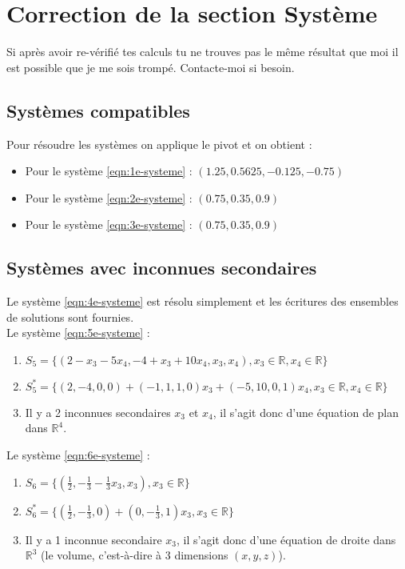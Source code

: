 \documentclass[a4paper]{article}\usepackage[]{graphicx}\usepackage[]{xcolor}
\newcommand{\R}{\mathbb{R}}
\begin{document}
\newpage

\section*{Correction de la section Système}
Si après avoir re-vérifié tes calculs tu ne trouves pas le même résultat que moi
il est possible que je me sois trompé. Contacte-moi si besoin.

\vspace{0,75cm}

\subsection*{Systèmes compatibles}

Pour résoudre les systèmes on applique le pivot et on obtient :
\begin{itemize}
    \item Pour le système \ref{eqn:1e-systeme} : $(1.25, 0.5625, -0.125, -0.75)$
    \item Pour le système \ref{eqn:2e-systeme} : $(0.75, 0.35, 0.9)$
    \item Pour le système \ref{eqn:3e-systeme} : $(0.75, 0.35, 0.9)$
\end{itemize}

\subsection*{Systèmes avec inconnues secondaires}
Le système \ref{eqn:4e-systeme} est résolu simplement et les écritures des 
ensembles de solutions sont fournies.\\

Le système \ref{eqn:5e-systeme} :
\begin{enumerate}
    \item $S_5 = \{(2 - x_3 - 5 x_4, -4 + x_3 + 10 x_4, x_3, x_4), x_3\in\R, x_4 \in \R \}$
    \item $S_5^* = \{(2, -4, 0, 0) + (-1, 1, 1, 0) x_3 + (-5, 10, 0, 1) x_4, x_3\in\R, x_4 \in \R \}$
    \item Il y a 2 inconnues secondaires $x_3$ et $x_4$, il s'agit donc d'une équation de plan dans $\R^4$.
\end{enumerate}

Le système \ref{eqn:6e-systeme} :
\begin{enumerate}
    \item $S_6 = \{(\frac{1}{2}, -\frac{1}{3} -\frac{1}{3} x_3, x_3), x_3\in\R\}$
    \item $S_6^* = \{(\frac{1}{2}, - \frac{1}{3}, 0) + (0, -\frac{1}{3}, 1) x_3, x_3\in\R\}$
    \item Il y a 1 inconnue secondaire $x_3$, il s'agit donc d'une équation de droite dans $\R^3$ (le volume, c'est-à-dire à 3 dimensions $(x,y,z)$).
\end{enumerate}
\end{document}
